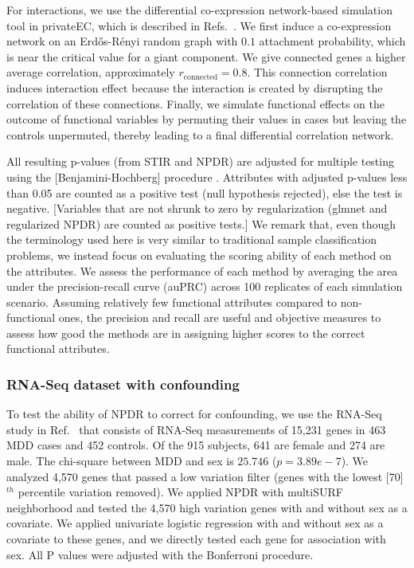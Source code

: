 \documentclass[10pt]{article}
\begin{document}
For interactions, we use the differential co-expression network-based simulation tool in privateEC, which is described in Refs.~\cite{le17, lareau15}. 
We first induce a co-expression network on an Erd\H{o}s-R\'enyi random graph with $0.1$ attachment probability, which is near the critical value for a giant component.
We give connected genes a higher average correlation, approximately $r_{\text{connected}}=0.8$. %
This connection correlation induces interaction effect because the interaction is created by disrupting the correlation of these connections. %
Finally, we simulate functional effects on the outcome of functional variables by permuting their values in cases but leaving the controls unpermuted, thereby leading to a final differential correlation network. 

All resulting p-values (from STIR and NPDR) are adjusted for multiple testing using the [Benjamini-Hochberg] procedure \cite{benjamini01}.
Attributes with adjusted p-values less than 0.05 are counted as a positive test (null hypothesis rejected), else the test is negative.
[Variables that are not shrunk to zero by regularization (glmnet and regularized NPDR) are counted as positive tests.]
We remark that, even though the terminology used here is very similar to traditional sample classification problems, we instead focus on evaluating the scoring ability of each method on the attributes.
We assess the performance of each method by averaging the area under the precision-recall curve (auPRC) across 100 replicates of each simulation scenario.
Assuming relatively few functional attributes compared to non-functional ones, the precision and recall are useful and objective measures to assess how good the methods are in assigning higher scores to the correct functional attributes.


\subsubsection{RNA-Seq dataset with confounding}
To test the ability of NPDR to correct for confounding, we use the RNA-Seq study in Ref.~\cite{mostafavi14} that consists of RNA-Seq measurements of 15,231 genes in 463 MDD cases and 452 controls.
Of the 915 subjects, 641 are female and 274 are male.
The chi-square between MDD and sex is $25.746$ ($p=3.89e-7$).
We analyzed 4,570 genes that passed a low variation filter (genes with the lowest [70]$^{th}$ percentile variation removed).
We applied NPDR with multiSURF neighborhood and tested the 4,570 high variation genes with and without sex as a covariate. 
We applied univariate logistic regression with and without sex as a covariate to these genes, and we directly tested each gene for association with sex.
All P values were adjusted with the Bonferroni procedure.
\end{document}
